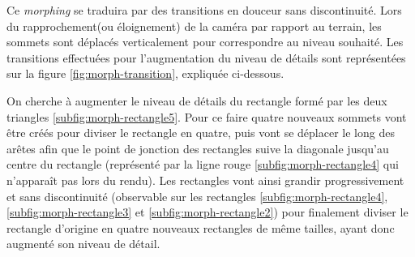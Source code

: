   Ce \emph{morphing} se traduira par des transitions en douceur sans discontinuité. Lors du rapprochement(ou éloignement) de la caméra par rapport au terrain, les sommets sont déplacés verticalement pour correspondre au niveau souhaité. Les transitions effectuées pour l'augmentation du niveau de détails sont représentées sur la figure \ref{fig:morph-transition}, expliquée ci-dessous. 
  
  On cherche à augmenter le niveau de détails du rectangle formé par les deux triangles \ref{subfig:morph-rectangle5}. Pour ce faire quatre nouveaux sommets vont être créés pour diviser le rectangle en quatre, puis vont se déplacer le long des arêtes afin que le point de jonction des rectangles suive la diagonale jusqu'au centre du rectangle (représenté par la ligne rouge \ref{subfig:morph-rectangle4} qui n'apparaît pas lors du rendu). Les rectangles vont ainsi grandir progressivement et sans discontinuité (observable sur les rectangles \ref{subfig:morph-rectangle4}, \ref{subfig:morph-rectangle3} et \ref{subfig:morph-rectangle2}) pour finalement diviser le rectangle d'origine en quatre nouveaux rectangles de même tailles, ayant donc augmenté son niveau de détail.
  
